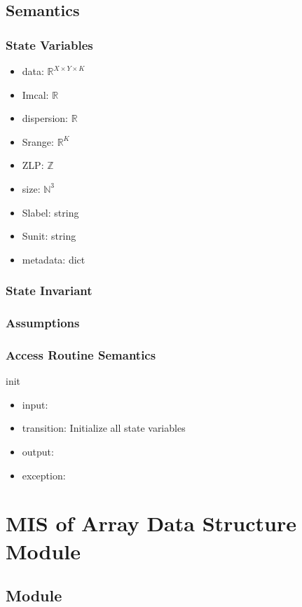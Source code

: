 \documentclass[12pt, titlepage]{article}
\begin{document}
\subsection{Semantics}

\subsubsection{State Variables}
\begin{itemize}
	\item data: $\mathbb{R}^{X \times Y \times K}$
	\item Imcal: $\mathbb{R}$
	\item dispersion: $\mathbb{R}$
	\item Srange: $\mathbb{R}^{K}$
	\item ZLP: $\mathbb{Z}$
	\item size: $\mathbb{N}^3$
	\item Slabel: string
	\item Sunit: string
	\item metadata: dict
\end{itemize}

\subsubsection{State Invariant}

\subsubsection{Assumptions}

\subsubsection{Access Routine Semantics}
init
\begin{itemize}
\item input: 
\item transition: Initialize all state variables
\item output: 
\item exception: 
\end{itemize}

\section{MIS of Array Data Structure Module} \label{Mod:Array} 

\subsection{Module}
\end{document}
